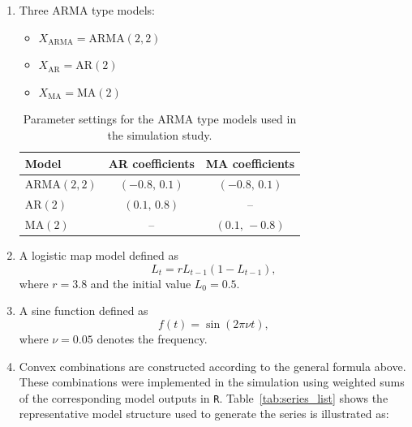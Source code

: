 \documentclass[12pt,a4paper]{article}
\begin{document}
\begin{enumerate}
	\item Three $\mathrm{ARMA}$ type models:
	\begin{itemize}
		\item $X_{\text{ARMA}} = \mathrm{ARMA}(2,2)$
		\item $X_{\text{AR}}   = \mathrm{AR}(2)$
		\item $X_{\text{MA}}   = \mathrm{MA}(2)$
	\end{itemize}
	
	\begin{table}[H]
		\centering
		\caption{Parameter settings for the $\mathrm{ARMA}$ type models used in the simulation study.}
		\label{tab:parameters}
		\begin{tabular}{lcc}
			\toprule
			\textbf{Model} & \textbf{AR coefficients} & \textbf{MA coefficients} \\ 
			\hline
			$\mathrm{ARMA}(2,2)$ & $(-0.8,\, 0.1)$ & $(-0.8,\, 0.1)$ \\ 
			\hline 
			$\mathrm{AR}(2)$     & $(0.1,\, 0.8)$ & -- \\ 
			\hline 
			$\mathrm{MA}(2)$     & -- & $(0.1,\, -0.8)$ \\ 
			\bottomrule
		\end{tabular}
	\end{table}
	
	\item A logistic map model defined as
	\[
	L_t = r L_{t-1}(1 - L_{t-1}),
	\]
	where $r = 3.8$ and the initial value $L_0 = 0.5$.
	
	\item A sine function defined as
	\[
	f(t) = \sin(2\pi \nu t),
	\]
	where $\nu = 0.05$ denotes the frequency.
	
	\item Convex combinations are constructed according to the general formula above. 
	These combinations were implemented in the simulation using weighted sums of the corresponding model outputs in \texttt{R}. 
	Table~\ref{tab:series_list} shows the representative model structure used to generate the series is illustrated as:
	
		
		

\end{enumerate}
\end{document}
